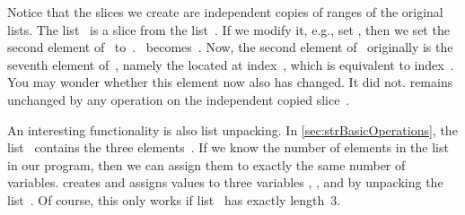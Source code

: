 Notice that the slices we create are independent copies of ranges of the original lists.
The list~ is a slice from the list~.
If we modify it, e.g., set , then we set the second element of~ to~.
~becomes~\pythonil{[7, 12, 6]}.
Now, the second element of~ originally is the seventh element of~, namely the  located at index~, which is equivalent to index~.
You may wonder whether this element now also has changed.
It did not.
 remains unchanged by any operation on the independent copied slice~.

An interesting functionality is also list unpacking.
In \cref{sec:strBasicOperations}, the list~ contains the three elements~\pythonil{[5, 6, 7]}.
If we know the number of elements in the list in our program, then we can assign them to exactly the same number of variables.
 creates and assigns values to three variables , , and  by unpacking the list~.
Of course, this only works if list~ has exactly length~3.%
%
\FloatBarrier%
\endhsection%
%
